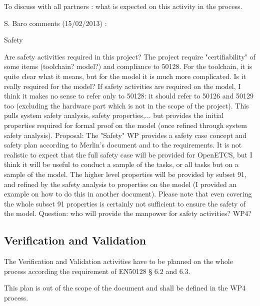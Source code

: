 \begin{issue}
To discuss with all partners :  what is expected on this activity in the process.

S. Baro comments (15/02/2013) :

Safety

Are safety activities required in this project? The project require "certifiability" of some items (toolchain? model?) and compliance to 50128. For the toolchain, it is quite clear what it means, but for the model it is much more complicated. Is it really required for the model? If safety activities are required on the model, I think it makes no sense to refer only to 50128: it should refer to 50126 and 50129 too (excluding the hardware part which is not in the scope of the project). This pulls system safety analysis, safety properties,... but provides the initial properties required for formal proof on the model (once refined through system safety analysis).
Proposal: The "Safety" WP provides a safety case concept and safety plan according to Merlin's document and to the requirements. It is not realistic to expect that the full safety case will be provided for OpenETCS, but I think it will be useful to conduct a sample of the tasks, or all tasks but on a sample of the model. The higher level properties will be provided by subset 91, and refined by the safety analysis to properties on the model (I provided an example on how to do this in another document). Please note that even covering the whole subset 91 properties is certainly not sufficient to ensure the safety of the model.
Question: who will provide the manpower for safety activities? WP4? 

\end{issue}


\subsection{Verification and Validation}


The Verification and Validation activities have to be planned on the whole process according the requirement of EN50128 § 6.2 and 6.3.

This plan is out of the scope of the document and shall be defined in the WP4 process.




